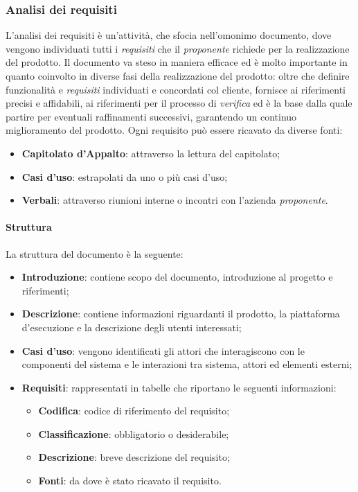 \subsubsection{Analisi dei requisiti}
L'analisi dei requisiti è un'attività, che sfocia nell'omonimo documento, dove vengono individuati tutti i \emph{requisiti} che il \emph{proponente} richiede per la realizzazione del prodotto.\newline{}
Il documento \AdR{} va steso in maniera efficace ed è molto importante in quanto coinvolto in diverse fasi della realizzazione del prodotto: oltre che definire funzionalità e \emph{requisiti} individuati e concordati col cliente, fornisce ai \progrs{} riferimenti precisi e affidabili, ai \verf{} riferimenti per il processo di \emph{verifica} ed è la base dalla quale partire per eventuali raffinamenti successivi, garantendo un continuo miglioramento del prodotto. 
Ogni requisito può essere ricavato da diverse fonti:
\begin{itemize}
	\item \textbf{Capitolato d'Appalto}: attraverso la lettura del capitolato;
	\item \textbf{Casi d'uso}: estrapolati da uno o più casi d'uso; 
	\item \textbf{Verbali}: attraverso riunioni interne o incontri con l'azienda \emph{proponente}.
\end{itemize}

\paragraph{Struttura}
La struttura del documento \AdR{} è la seguente:
\begin{itemize}
	\item \textbf{Introduzione}: contiene scopo del documento, introduzione al progetto e riferimenti;
	\item \textbf{Descrizione}: contiene informazioni riguardanti il prodotto, la piattaforma d'esecuzione e la descrizione degli utenti interessati;
	\item \textbf{Casi d'uso}: vengono identificati gli attori che interagiscono con le componenti del sistema e le interazioni tra sistema, attori ed elementi esterni;
	\item \textbf{Requisiti}: rappresentati in tabelle che riportano le seguenti informazioni:
		\begin{itemize}
			\item \textbf{Codifica}: codice di riferimento del requisito;
			\item \textbf{Classificazione}: obbligatorio o desiderabile;
			\item \textbf{Descrizione}: breve descrizione del requisito;
			\item \textbf{Fonti}: da dove è stato ricavato il requisito.
		\end{itemize}
\end{itemize}

